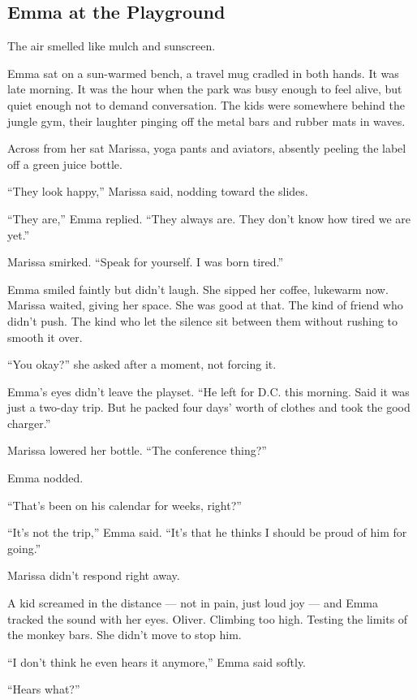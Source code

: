 
\subsection{Emma at the Playground}

The air smelled like mulch and sunscreen.

Emma sat on a sun-warmed bench, a travel mug cradled in both hands. It was late morning. It was the hour 
when the park was busy enough to feel alive, but quiet enough not to demand conversation. The kids 
were somewhere behind the jungle gym, their laughter pinging off the metal bars and rubber mats in 
waves.

Across from her sat Marissa, yoga pants and aviators, absently peeling the label off a green juice bottle.

``They look happy,'' Marissa said, nodding toward the slides.

``They are,'' Emma replied. ``They always are. They don’t know how tired we are yet.''

Marissa smirked. ``Speak for yourself. I was born tired.''

Emma smiled faintly but didn’t laugh. She sipped her coffee, lukewarm now. Marissa waited, giving her 
space. She was good at that. The kind of friend who didn’t push. The kind who let the silence sit between 
them without rushing to smooth it over.

``You okay?'' she asked after a moment, not forcing it.

Emma’s eyes didn’t leave the playset. ``He left for D.C. this morning. Said it was just a two-day trip. 
But he packed four days’ worth of clothes and took the good charger.''

Marissa lowered her bottle. ``The conference thing?''

Emma nodded.

``That’s been on his calendar for weeks, right?''

``It’s not the trip,'' Emma said. ``It’s that he thinks I should be proud of him for going.''

Marissa didn’t respond right away.

A kid screamed in the distance --- not in pain, just loud joy --- and Emma tracked the sound with her eyes. 
Oliver. Climbing too high. Testing the limits of the monkey bars. She didn't move to stop him.

``I don’t think he even hears it anymore,'' Emma said softly.

``Hears what?''

